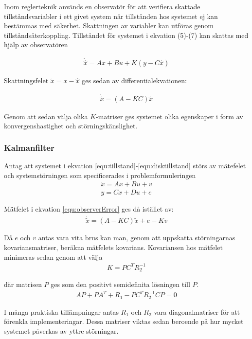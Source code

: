 \documentclass[a4paper,12pt,fleqn]{article}
\begin{document}
Inom reglerteknik används en observatör för att verifiera skattade tillståndsvariabler i ett givet system när tillstånden hos systemet ej kan bestämmas med säkerhet. Skattningen av variabler kan utföras genom tillståndsåterkoppling.  Tillståndet för systemet i ekvation (5)-(7) kan skattas med hjälp av observatören

\begin{gather}
\dot{\hat{x}} = Ax + Bu + K(y - C\hat{x})
\label{equ:observer}
\end{gather}

Skattningsfelet $\tilde{x}= x - \hat{x}$ ges sedan av differentialekvationen: 

\begin{gather}
\dot{\tilde{x}} = (A - KC)\tilde{x}
\label{equ:observerError}
\end{gather}

Genom att sedan välja olika $K$-matriser ges systemet olika egenskaper i form av konvergenshastighet och störningskänslighet. 

\subsubsection{Kalmanfilter}

Antag att systemet i ekvation \ref{equ:tillstand}-\ref{equ:disktillstand} störs av mätefelet och systemstörningen som specificerades i problemformuleringen
\begin{gather}
\dot{x}=Ax+Bu+v \\
y=Cx+Du+e
\end{gather}

Mätfelet i ekvation \ref{equ:observerError} ges då istället av: 
\begin{gather}
\dot{\tilde{x}} = (A - KC)\tilde{x} + e - Kv
\end{gather}

Då $e$ och $v$ antas vara vita brus kan man, genom att uppskatta störningarnas kovariansmatriser, beräkna mätfelets kovarians. Kovariansen hos mätfelet minimeras sedan genom att välja 
\begin{gather}
K = PC^{T}R_{2}^{-1}
\end{gather}

där matrisen $P$ ges som den positivt semidefinita lösningen till $P$. 
\begin{gather}
AP + PA^{T} + R_{1} - PC^{T}R_{2}^{-1}CP = 0
\end{gather}

I många praktiska tillämpningar antas $R_{1}$ och $R_{2}$ vara diagonalmatriser för att förenkla implementeringar. Dessa matriser viktas sedan beroende på hur mycket systemet påverkas av yttre störningar. 
\end{document}
